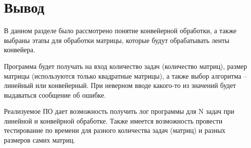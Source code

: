 \section{Вывод}

В данном разделе было рассмотрено понятие конвейерной обработки, а также выбраны этапы для обработки матрицы, которые будут обрабатывать ленты конвейера.

Программа будет получать на вход количество задач (количество матриц), размер матрицы (используются только квадратные матрицы), а также выбор алгоритма -- линейный или конвейерный. При неверном вводе какого-то из значений будет выдаваться сообщение об ошибке.

Реализуемое ПО дает возможность получить лог программы для N задач при линейной и конвейрной обработке. Также имеется возможность провести тестирование по времени для разного количества задач (матриц) и разных размеров самих матриц.
